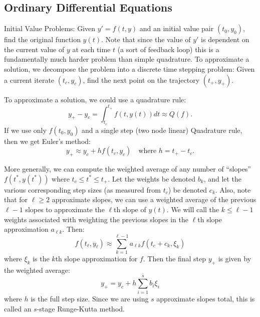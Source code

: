 \documentclass[12pt]{article}
\begin{document}
\subsection*{Ordinary Differential Equations}

Initial Value Problems:
Given $y' = f(t,y)$ and an initial value pair $(t_0, y_0)$, find the original 
function $y(t)$.
Note that since the value of $y'$ is dependent on the current value of $y$ at
each time $t$ (a sort of feedback loop) this is a fundamentally much
harder problem than simple quadrature.
To approximate a solution, we decompose the problem into a discrete time
stepping problem:
Given a current iterate $(t_c, y_c)$, find the next point on the
trajectory $(t_+, y_+)$.

To approximate a solution, we could use a quadrature rule:
$$
y_+- y_c = \int_{t_c}^{t_+} f(t,y(t)) dt \approx Q(f).
$$
If we use only $f(t_0,y_0)$ and a single step (two node linear) Quadrature rule, 
then we get Euler's method:
$$
y_+ \approx y_c + h f(t_c, y_c) \quad \text{where $h = t_+ - t_c$.}
$$

More generally, we can compute the weighted average of any number of
``slopes'' $f(t^*,y(t^*))$ where $t_c \leq t^* \leq t_+$.
Let the weights be denoted $b_k$, and let the various corresponding 
step sizes (as measured from $t_c$) be denoted $c_k$.
Also, note that for $\ell \geq 2$ approximate slopes, 
we can use a weighted average of the previous $\ell-1$ slopes to 
approximate the $\ell$th slope of $y(t)$.
We will call the $k \leq \ell - 1$ weights associated with weighting 
the previous slopes in the $\ell$th slope approximation 
$a_{\ell k}$. Then:
$$
f(t_\ell, y_\ell) \approx \sum_{k=1}^{\ell-1} a_{\ell k} f(t_c + c_k, \xi_k) 
$$
where $\xi_k$ is the $k$th slope approximation for $f$.
Then the final step $y_+$ is given by the weighted average:
$$
y_+ = y_c + h \sum_{i=1}^s b_i \xi_i
$$
where $h$ is the full step size.
Since we are using $s$ approximate slopes total, this is called an
$s$-stage Runge-Kutta method.
\end{document}
